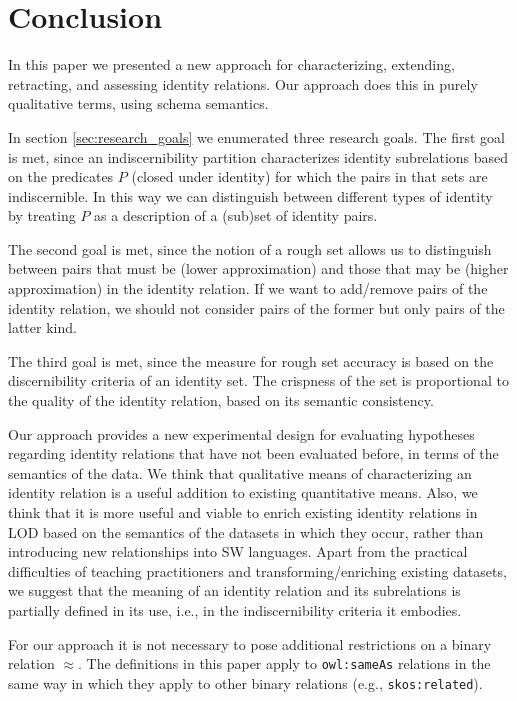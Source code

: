 \section{Conclusion}
\label{sec:conclusion}

In this paper we presented a new approach for characterizing,
  extending, retracting, and assessing identity relations.
Our approach does this in purely qualitative terms, using schema semantics.

In section \ref{sec:research_goals} we enumerated three research goals.
The first goal is met, since an indiscernibility partition characterizes
  identity subrelations based on the predicates $P$ (closed under identity)
  for which the pairs in that sets are indiscernible.
In this way we can distinguish between different types of identity
  by treating $P$ as a description of a (sub)set of identity pairs.

The second goal is met, since the notion of a rough set allows us to
  distinguish between pairs that must be (lower approximation)
  and those that may be (higher approximation)
  in the identity relation.
If we want to add/remove pairs of the identity relation,
  we should not consider pairs of the former but only pairs of
  the latter kind.

The third goal is met, since the measure for rough set accuracy
  is based on the discernibility criteria of an identity set.
The crispness of the set is proportional to the quality of the
  identity relation, based on its semantic consistency.

Our approach provides a new experimental design for evaluating
  hypotheses regarding identity relations that have not been
  evaluated before, in terms of the semantics of the data.
We think that qualitative means of characterizing an identity relation
  is a useful addition to existing quantitative means.
Also, we think that it is more useful and viable to enrich existing
  identity relations in LOD based on the semantics of the datasets
  in which they occur,
  rather than introducing new relationships into SW languages.
Apart from the practical difficulties of teaching practitioners
  and transforming/enriching existing datasets, we suggest that the
  meaning of an identity relation and its subrelations
  is partially defined in its use,
  i.e., in the indiscernibility criteria it embodies.

For our approach it is not necessary to pose additional restrictions
  on a binary relation $\approx$.
The definitions in this paper apply to {\small \texttt{owl:sameAs}} relations
  in the same way in which they apply to other binary relations
  (e.g., {\small \texttt{skos:related}}).

